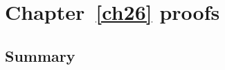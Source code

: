 \chapter{Chapter~\ref{ch26} proofs}

\newpage
\section{Summary}\label{ch26.ps.summary}
\lpscriptsummary
